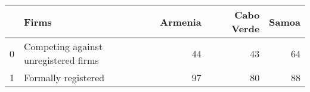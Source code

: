 \begin{tabular}{llrrr}
\toprule
 & Firms & Armenia & Cabo Verde & Samoa \\
\midrule
0 & Competing against unregistered firms & 44 & 43 & 64 \\
1 & Formally registered & 97 & 80 & 88 \\
\bottomrule
\end{tabular}
